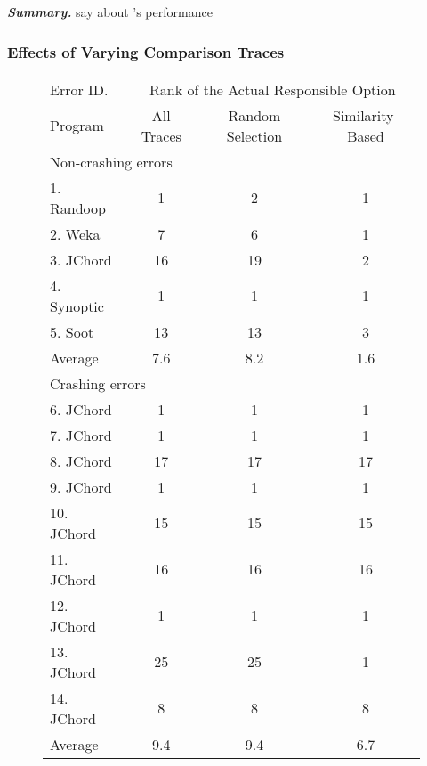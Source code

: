 



\vspace{1mm}
\noindent \textbf{\textit{Summary.}} say about \ourtool's performance

\vspace{1mm}

\subsubsection{Effects of Varying Comparison Traces}
\label{sec:ranking}


\begin{figure}[t]
\setlength{\tabcolsep}{.74\tabcolsep}
\small{
\begin{tabular}{|l|c|c||c|}
\hline
 Error ID. & \multicolumn{3}{|c|}{Rank of the Actual Responsible Option } \\
\cline{2-4}
 Program & All Traces & Random Selection&  Similarity-Based\\
 \hline
\hline
\multicolumn{4}{|l|}{Non-crashing errors}   \\
 \hline
 1. Randoop & 1 & 2 & 1\\
 2. Weka & 7 & 6 & 1\\
 3. JChord & 16 & 19 & 2\\
 4. Synoptic & 1 & 1 & 1\\
 5. Soot & 13 & 13 & 3\\
\hline
Average & 7.6 & 8.2 & 1.6 \\
\hline
\hline
\multicolumn{4}{|l|}{Crashing errors}   \\
\hline
 6. JChord & 1 & 1 &1\\
 7. JChord & 1 & 1 &1\\
 8. JChord & 17 & 17 &17\\
 9. JChord & 1 &  1&1\\
 10. JChord & 15 & 15 &15\\
 11. JChord & 16 & 16 &16\\
 12. JChord & 1 & 1 &1\\
 13. JChord & 25 & 25 &1\\
 14. JChord & 8 & 8 &8\\
\hline
Average & 9.4 & 9.4 & 6.7\\
\hline
\end{tabular}
}
\end{figure}


